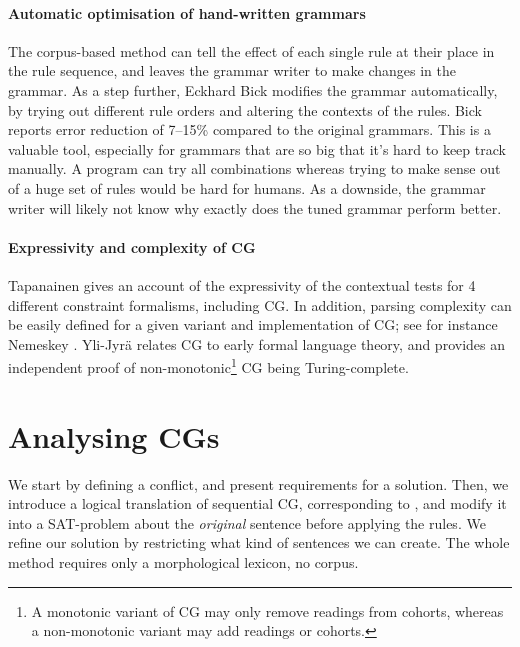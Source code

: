 \paragraph{Automatic optimisation of hand-written grammars }

The corpus-based method can tell the effect of each single rule at their place in the rule sequence, and leaves the grammar writer to make changes in the grammar.
As a step further, Eckhard Bick \cite{bick2013tuning} modifies the grammar automatically, by trying
out different rule orders and altering the contexts of the rules. 
Bick reports error reduction of 7--15\% compared to the original grammars.
This is a valuable tool, especially for grammars that are so big that it's hard to keep track manually. A program can try all combinations whereas trying to make sense out of a huge set of rules would be hard for humans.
As a downside, the grammar writer will likely not know why exactly does the tuned grammar perform better.


\paragraph{Expressivity and complexity of CG}
Tapanainen \cite{tapanainen1999phd} gives an account of the expressivity of
the contextual tests for 4 different constraint formalisms, including CG. 
In addition, parsing complexity can be easily defined for a given variant and 
implementation of CG; see for instance Nemeskey \cite{nemeskey14}.
Yli-Jyrä \cite{ylijyra2017} relates CG to early formal language theory, and
provides an independent proof of non-monotonic\footnote{A monotonic
  variant of CG may only remove readings from cohorts, whereas a non-monotonic
  variant may add readings or cohorts.} CG being Turing-complete.

\section{Analysing CGs}
\label{sec:sectionCGana}

We start by defining a conflict, and present requirements for a solution.
Then, we introduce a logical translation of sequential CG, corresponding to \cite{lager_nivre01}, and modify it into a SAT-problem about the \emph{original} sentence before applying the rules.
We refine our solution by restricting what kind of sentences we can create.
The whole method requires only a morphological lexicon, no corpus. 

